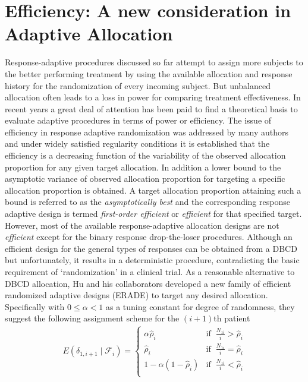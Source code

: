 \section{Efficiency: A new consideration in Adaptive Allocation}

Response-adaptive procedures discussed so far  attempt to assign more subjects to the better performing treatment by using the available allocation and response history for the randomization of every incoming subject. But unbalanced  allocation  often leads to a loss in power for comparing treatment effectiveness. In recent years a great deal of attention has been paid to find a theoretical basis to evaluate adaptive procedures in terms of power or efficiency. The issue of efficiency in response adaptive randomization was addressed  by  many authors and under widely satisfied regularity conditions it is established that the efficiency is a decreasing function of the variability  of the observed allocation proportion for any given target allocation\cite{69,70}. In addition a lower bound to the asymptotic variance of observed allocation proportion for targeting a specific allocation proportion is obtained\cite{70}. A target allocation proportion attaining such a bound is referred to as the \textit{asymptotically best}\cite{70} and the corresponding response adaptive design is termed  \textit{first-order efficient}\cite{71} or \textit{efficient}\cite{71} for that specified target. However, most of the available response-adaptive allocation designs are not \textit{efficient} except for the binary response drop-the-loser procedures\cite{17,18}. Although an efficient design for the general types of responses can be obtained from a DBCD\cite{36} but unfortunately, it results in a deterministic procedure, contradicting the basic requirement of `randomization' in a clinical trial. As a reasonable alternative to DBCD allocation, Hu and his collaborators\cite{71} developed a new family of efficient randomized adaptive designs (ERADE) to target any desired allocation. Specifically with $0\leq \alpha <1$ as a tuning constant for degree of randomness, they suggest the following assignment scheme for the $(i+1)$th patient
 \begin{eqnarray*}
E(\delta_{1,i+1}\mid \mathcal{F}_{i})=
\left\{\begin{array}{ll}
\alpha \hat{\rho}_{i} & \mbox{if }~\frac{N_{1i}}{i}>\hat{\rho}_{i}\\
\hat{\rho}_{i}& \mbox{if }~\frac{N_{1i}}{i}=\hat{\rho}_{i}\\
1-\alpha (1-\hat{\rho}_{i}) & \mbox{if }~\frac{N_{1i}}{i}<\hat{\rho}_{i}\\
\end{array}\right.
\end{eqnarray*}
